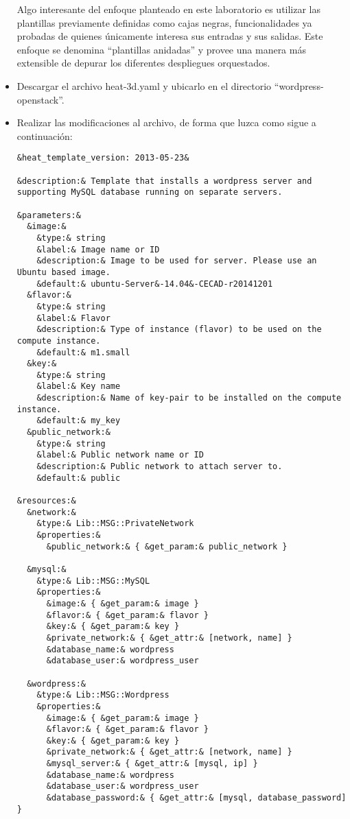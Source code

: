 \documentclass[10pt]{article}   			%
\begin{document}
\begin{itemize}
Algo interesante del enfoque planteado en este laboratorio es utilizar las plantillas previamente definidas como cajas negras, funcionalidades ya probadas de quienes únicamente interesa sus entradas y sus salidas. Este enfoque se denomina “plantillas anidadas” y provee una manera más extensible de depurar los diferentes despliegues orquestados.
		
	\item Descargar el archivo heat-3d.yaml y ubicarlo en el directorio “wordpress-openstack”.
	\item Realizar las modificaciones al archivo, de forma que luzca como sigue a continuación:
	\begin{small}
	\begin{lstlisting}[frame=single,style=base]	
&heat_template_version: 2013-05-23&

&description:& Template that installs a wordpress server and supporting MySQL database running on separate servers.

&parameters:&
  &image:&
    &type:& string
    &label:& Image name or ID
    &description:& Image to be used for server. Please use an Ubuntu based image.
    &default:& ubuntu-Server&-14.04&-CECAD-r20141201
  &flavor:&
    &type:& string
    &label:& Flavor
    &description:& Type of instance (flavor) to be used on the compute instance.
    &default:& m1.small
  &key:&
    &type:& string
    &label:& Key name
    &description:& Name of key-pair to be installed on the compute instance.
    &default:& my_key
  &public_network:&
    &type:& string
    &label:& Public network name or ID
    &description:& Public network to attach server to.
    &default:& public
 
&resources:&
  &network:&
    &type:& Lib::MSG::PrivateNetwork
    &properties:&
      &public_network:& { &get_param:& public_network }

  &mysql:&
    &type:& Lib::MSG::MySQL
    &properties:&
      &image:& { &get_param:& image }
      &flavor:& { &get_param:& flavor }
      &key:& { &get_param:& key }
      &private_network:& { &get_attr:& [network, name] }
      &database_name:& wordpress
      &database_user:& wordpress_user
 
  &wordpress:&
    &type:& Lib::MSG::Wordpress
    &properties:&
      &image:& { &get_param:& image }
      &flavor:& { &get_param:& flavor }
      &key:& { &get_param:& key }
      &private_network:& { &get_attr:& [network, name] }
      &mysql_server:& { &get_attr:& [mysql, ip] }
      &database_name:& wordpress
      &database_user:& wordpress_user
      &database_password:& { &get_attr:& [mysql, database_password] }


\end{lstlisting}
\end{small}
\end{itemize}
\end{document}
